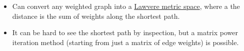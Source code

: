 \begin{itemize}
    \item Can convert any weighted graph into a \hyperref[D2.53]{Lawvere metric space}, where a the distance is the sum of weights along the shortest path.
    \item It can be hard to see the shortest path by inspection, but a matrix power iteration method (starting from just a matrix of edge weights) is possible.
  \end{itemize}